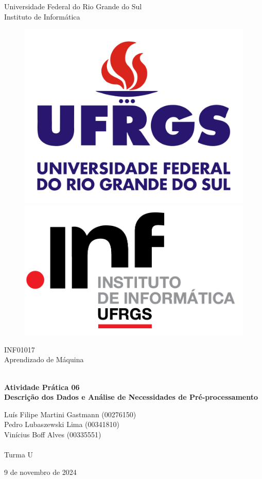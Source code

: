 \documentclass{report}
\begin{document}
    \begin{titlepage}
        \centering
        
        \LARGE {Universidade Federal do Rio Grande do Sul \\ Instituto de Informática}
    
        \begin{figure}[h!]
        \centering
        \subfigure
        {\includegraphics[width=0.35\linewidth]{images/logos/UFRGS.png}}
        \hspace{1cm}
        \subfigure
        {\includegraphics[width=0.35\linewidth]{images/logos/INF.png}}
        \end{figure}
    
        \LARGE {INF01017 \\ Aprendizado de Máquina}
        
        \vfill
        {\noindent\hrulefill \\
        \bfseries \Huge{Atividade Prática 06} \\ \LARGE{Descrição dos Dados e Análise de Necessidades de Pré-processamento} \\
        \noindent\hrulefill}
        
        \vfill
        {\LARGE Luís Filipe Martini Gastmann (00276150) \\ Pedro Lubaszewski Lima (00341810) \\ Vinícius Boff Alves (00335551) \\~\\ Turma U}
    
        \vfill
        {\LARGE 9 de novembro de 2024}
        
    \end{titlepage}

        \renewcommand{\contentsname}{Sumário}
        \tableofcontents
        \clearpage
\end{document}
